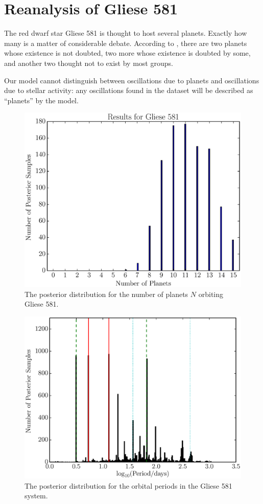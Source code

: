 \documentclass[useAMS,usenatbib]{mn2e}
\begin{document}
\section{Reanalysis of Gliese 581}

The red dwarf star Gliese 581 is thought to host several planets. Exactly
how many is a matter of considerable debate. According to \citet{}, there
are two planets whose existence is not doubted, two more whose existence is
doubted by some, and another two thought not to exist by most groups.

Our model cannot distinguish between oscillations due to planets and
oscillations due to stellar activity: any oscillations found in the dataset
will be described as ``planets'' by the model.

\begin{figure}
\includegraphics[scale=0.5]{Figures/gliese581_N.eps}
\caption{The posterior distribution for the number of planets $N$ orbiting
Gliese 581.\label{fig:gliese581_N}}
\end{figure}

\begin{figure}
\includegraphics[scale=0.5]{Figures/gliese581_periods.eps}
\caption{The posterior distribution for the orbital periods in the Gliese 581
system.\label{fig:gliese581_periods}}
\end{figure}
\end{document}
